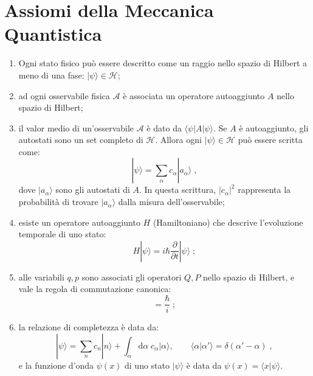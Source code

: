 \documentclass[12pt,a4paper]{report}
\theoremstyle{definition}
\newcommand{\ham}{\mathcal{H}}
\numberwithin{equation}{section}
\newcommand{\diff}[1][]{\mathrm{d}#1}
\newcommand{\bra}{\langle}
\newcommand{\ket}{\rangle}
\begin{document}
\section{Assiomi della Meccanica Quantistica}
\begin{enumerate}
\item Ogni stato fisico può essere descritto come un raggio nello spazio di Hilbert a meno di una fase: $|\psi\ket\in\ham$;
\item ad ogni osservabile fisica $\mathcal{A}$ è associata un operatore autoaggiunto $A$ nello spazio di Hilbert;
\item il valor medio di un'osservabile $\mathcal{A}$ è dato da $\bra\psi|A|\psi\ket$. Se $A$ è autoaggiunto, gli autostati sono un set completo di $\ham$. Allora ogni $|\psi\ket\in\ham$ può essere scritta come:
\begin{equation}
|\psi\ket=\sum_{\alpha}c_{\alpha}|a_{\alpha}\ket\;,
\end{equation}
dove $|a_{\alpha}\ket$ sono gli autostati di $A$. In questa scrittura, $|c_{\alpha}|^2$ rappresenta la probabilità di trovare $|a_{\alpha}\ket$ dalla misura dell'osservabile;
\item esiste un operatore autoaggiunto $H$ (Hamiltoniano) che descrive l'evoluzione temporale di uno stato:
\begin{equation}
H|\psi\ket=i\hbar\frac{\partial}{\partial t}|\psi\ket\;;
\end{equation}
\item alle variabili $q,p$ sono associati gli operatori $Q,P$ nello spazio di Hilbert, e vale la regola di commutazione canonica:
\begin{equation}
[P,Q]=\frac{\hbar}{i}\;;
\end{equation}
\item la relazione di completezza è data da:
\begin{equation}
|\psi\ket=\sum_n c_n|n\ket+\int_{\alpha}\diff{\alpha}\; c_{\alpha}|\alpha\ket, \qquad \bra\alpha|\alpha'\ket=\delta(\alpha'-\alpha)\;,
\end{equation}
e la funzione d'onda $\psi(x)$ di uno stato $|\psi\ket$ è data da $\psi(x)=\bra x|\psi\ket$.
\end{enumerate}
\end{document}
